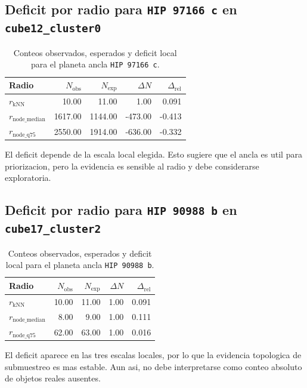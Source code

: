 \subsection{Deficit por radio para \texttt{HIP 97166 c} en \texttt{cube12\_cluster0}}
\begin{table}[H]
\centering
\small
\caption{Conteos observados, esperados y deficit local para el planeta ancla \texttt{HIP 97166 c}.}
\begin{tabular}{lrrrr}
\toprule
Radio & $N_{\mathrm{obs}}$ & $N_{\mathrm{exp}}$ & $\Delta N$ & $\Delta_{\mathrm{rel}}$ \\
\midrule
$r_{\mathrm{kNN}}$ & 10.00 & 11.00 & 1.00 & 0.091 \\
$r_{\mathrm{node\_median}}$ & 1617.00 & 1144.00 & -473.00 & -0.413 \\
$r_{\mathrm{node\_q75}}$ & 2550.00 & 1914.00 & -636.00 & -0.332 \\
\bottomrule
\end{tabular}
\end{table}
El deficit depende de la escala local elegida. Esto sugiere que el ancla es util para priorizacion, pero la evidencia es sensible al radio y debe considerarse exploratoria.

\subsection{Deficit por radio para \texttt{HIP 90988 b} en \texttt{cube17\_cluster2}}
\begin{table}[H]
\centering
\small
\caption{Conteos observados, esperados y deficit local para el planeta ancla \texttt{HIP 90988 b}.}
\begin{tabular}{lrrrr}
\toprule
Radio & $N_{\mathrm{obs}}$ & $N_{\mathrm{exp}}$ & $\Delta N$ & $\Delta_{\mathrm{rel}}$ \\
\midrule
$r_{\mathrm{kNN}}$ & 10.00 & 11.00 & 1.00 & 0.091 \\
$r_{\mathrm{node\_median}}$ & 8.00 & 9.00 & 1.00 & 0.111 \\
$r_{\mathrm{node\_q75}}$ & 62.00 & 63.00 & 1.00 & 0.016 \\
\bottomrule
\end{tabular}
\end{table}
El deficit aparece en las tres escalas locales, por lo que la evidencia topologica de submuestreo es mas estable. Aun asi, no debe interpretarse como conteo absoluto de objetos reales ausentes.

